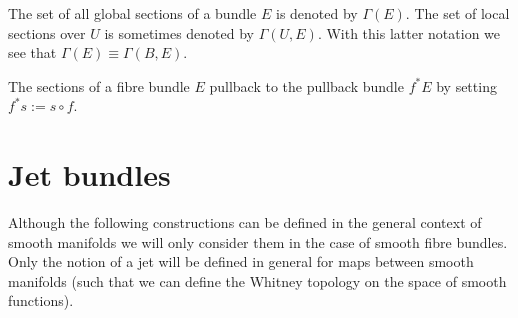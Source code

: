     \begin{notation}
        The set of all global sections of a bundle $E$ is denoted by $\Gamma(E)$. The set of local sections over $U$ is sometimes denoted by $\Gamma(U, E)$. With this latter notation we see that $\Gamma(E)\equiv\Gamma(B, E)$.
    \end{notation}

    \begin{property}
        The sections of a fibre bundle $E$ pullback to the pullback bundle $f^*E$ by setting $f^*s := s\circ f$.
    \end{property}

\section{Jet bundles}\label{section:jet_bundles}

    Although the following constructions can be defined in the general context of smooth manifolds we will only consider them in the case of smooth fibre bundles. Only the notion of a jet will be defined in general for maps between smooth manifolds (such that we can define the Whitney topology on the space of smooth functions).


